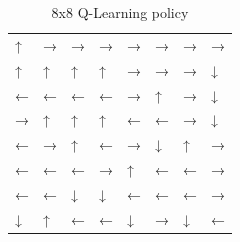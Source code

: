 \documentclass[a4paper]{article}
\begin{document}
\begin{table}[!ht]
	\centering
	\begin{tabular}{llllllll}
		↑ & → & → & → & → & → & → & →
\\
		↑ & ↑ & ↑ & ↑ & → & → & → & ↓
\\
		← & ← & ← & ← & → & ↑ & → & ↓
\\
		→ & ↑ & ↑ & ↑ & ← & ← & → & ↓
\\
		← & → & ↑ & ← & → & ↓ & ↑ & →
\\
		← & ← & ← & → & ↑ & ← & ← & →
\\
		← & ← & ↓ & ↓ & ← & ← & ← & →
\\
		↓ & ↑ & ← & ← & ↓ & → & ↓ & ←
	\end{tabular}
	\caption{8x8 Q-Learning policy}
\end{table}
\end{document}

